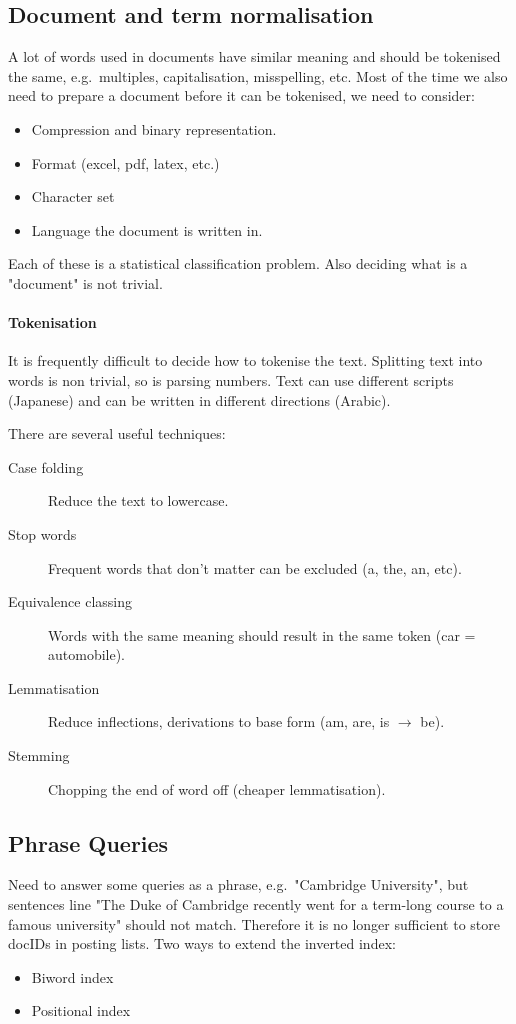 \documentclass[a5paper]{report}
\begin{document}
\subsection{Document and term normalisation}
A lot of words used in documents have similar meaning and should be tokenised the same, e.g.\ multiples, capitalisation, misspelling, etc.
Most of the time we also need to prepare a document before it can be tokenised, we need to consider:
\begin{itemize}
\item Compression and binary representation.
\item Format (excel, pdf, latex, etc.)
\item Character set
\item Language the document is written in.
\end{itemize}
Each of these is a statistical classification problem.
Also deciding what is a "document" is not trivial.

\paragraph{Tokenisation} It is frequently difficult to decide how to tokenise the text.
Splitting text into words is non trivial, so is parsing numbers.
Text can use different scripts (Japanese) and can be written in different directions (Arabic).

There are several useful techniques:
\begin{description}
\item[Case folding] Reduce the text to lowercase.
\item[Stop words] Frequent words that don't matter can be excluded (a, the, an, etc).
\item[Equivalence classing] Words with the same meaning should result in the same token (car = automobile).
\item[Lemmatisation] Reduce inflections, derivations to base form (am, are, is $\rightarrow$ be).
\item[Stemming] Chopping the end of word off (cheaper lemmatisation).
\end{description}

\subsection{Phrase Queries}
Need to answer some queries as a phrase, e.g.\ "Cambridge University", but sentences line "The Duke of Cambridge recently went for a term-long course to a famous university" should not match.
Therefore it is no longer sufficient to store docIDs in posting lists.
Two ways to extend the inverted index:
\begin{itemize}
\item Biword index
\item Positional index
\end{itemize}
\end{document}
